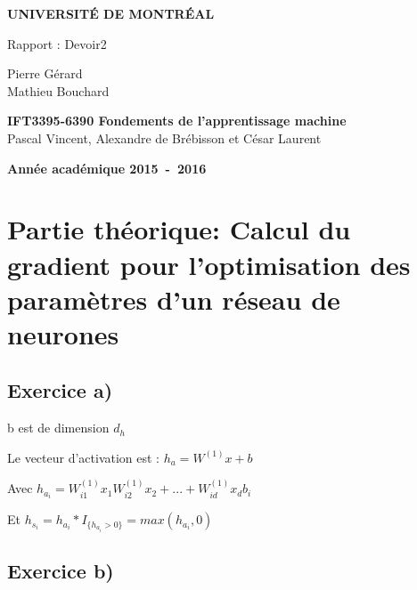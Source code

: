 \documentclass[a4paper,10pt]{article}
\begin{document}
\begin{titlepage}
\begin{center}
\textbf{\textsc{UNIVERSIT\'E DE MONTR\'EAL}}\\
\vfill{}\vfill{}
\begin{center}{\Huge Rapport : Devoir2 }\end{center}{\Huge \par}
\begin{center}{\large Pierre Gérard \\ Mathieu Bouchard}\end{center}{\Huge \par}
\vfill{}\vfill{} \vfill{}
\begin{center}{\large \textbf{IFT3395-6390 Fondements de l'apprentissage machine}}\hfill{\\Pascal Vincent, Alexandre de Brébisson et César Laurent}\end{center}{\large\par}
\vfill{}\vfill{}\enlargethispage{3cm}
\textbf{Année académique 2015~-~2016}
\end{center}
\end{titlepage}





\section{Partie théorique: Calcul du gradient pour l’optimisation des paramètres d'un réseau de neurones}

\subsection{Exercice a)}

b est de dimension $d_{h}$

Le vecteur d'activation est : $h_{a} = W^{(1)}x +b$

Avec $ h_{a_i} = W^{(1)}_{i1} x_{1}  W^{(1)}_{i2} x_{2} + ... + W^{(1)}_{id} x_{d} b_{i}$

Et $h_{s_i} = h_{a_i}*I_{ \{ h_{a_i} > 0 \} } = max(h_{a_i}, 0)$

\subsection{Exercice b)}
\end{document}
